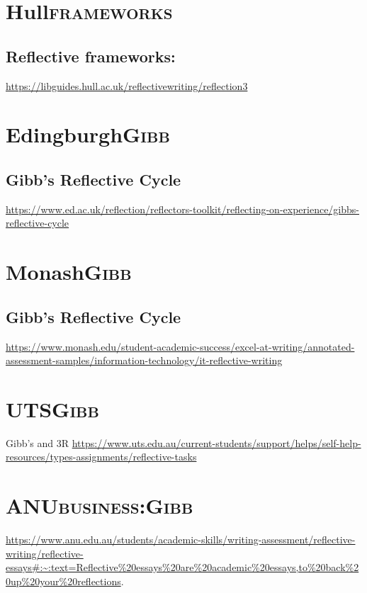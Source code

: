 \documentclass[11pt]{article}
\begin{document}
\section{Hull\hfill{}\textsc{frameworks}}
\label{sec:orgfb8c074}
\subsection{Reflective frameworks:}
\label{sec:orgf7effd9}
\url{https://libguides.hull.ac.uk/reflectivewriting/reflection3}



\section{Edingburgh\hfill{}\textsc{Gibb}}
\label{sec:org9ebcb57}
\subsection{Gibb's Reflective Cycle}
\label{sec:org13cd55d}
\url{https://www.ed.ac.uk/reflection/reflectors-toolkit/reflecting-on-experience/gibbs-reflective-cycle}


\section{Monash\hfill{}\textsc{Gibb}}
\label{sec:org22a4053}
\subsection{Gibb's Reflective Cycle}
\label{sec:org46e61d9}
\url{https://www.monash.edu/student-academic-success/excel-at-writing/annotated-assessment-samples/information-technology/it-reflective-writing}


\section{UTS\hfill{}\textsc{Gibb}}
\label{sec:orgc4019fb}
Gibb's and 3R
\url{https://www.uts.edu.au/current-students/support/helps/self-help-resources/types-assignments/reflective-tasks}


\section{ANU\hfill{}\textsc{business:Gibb}}
\label{sec:org6f2399c}
\url{https://www.anu.edu.au/students/academic-skills/writing-assessment/reflective-writing/reflective-essays\#:\~:text=Reflective\%20essays\%20are\%20academic\%20essays,to\%20back\%20up\%20your\%20reflections}.
\end{document}
